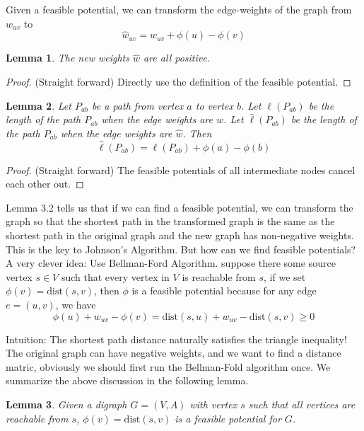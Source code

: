 \documentclass[11pt]{article}
\theoremstyle{plain}
\newtheorem{lemma}{Lemma}[section]
\begin{document}
  Given a feasible potential, we can transform the edge-weights of the graph from $w_{uv}$ to 
  \[
    \hat w_{uv} = w_{uv} + \phi(u) - \phi(v)
  \]

  \begin{lemma}
    The new weights $\hat w$ are all positive.
  \end{lemma}

  \begin{proof}
    (Straight forward) Directly use the definition of the feasible potential.
  \end{proof}

  \begin{lemma}
    Let $P_{ab}$ be a path from vertex $a$ to vertex $b$. Let $\ell(P_{ab})$ be the length of the path $P_{ab}$
    when the edge weights are $w$. Let $\hat \ell(P_{ab})$ be the length of the path $P_{ab}$ when the edge weights
    are $\hat w$. Then 
    \[
      \hat \ell(P_{ab}) = \ell(P_{ab}) + \phi(a) - \phi(b)
    \]
  \end{lemma}

  \begin{proof}
    (Straight forward) The feasible potentials of all intermediate nodes cancel each other out.
  \end{proof}

  Lemma 3.2 tells us that if we can find a feasible potential, we can transform the graph so that the shortest path
  in the transformed graph is the same as the shortest path in the original graph and the new graph has non-negative weights.
  This is the key to Johnson's Algorithm. But how can we find feasible potentials? A very clever idea: Use Bellman-Ford Algorithm.
  suppose there some source vertex $s \in V$ such that every vertex in $V$ is reachable from $s$, if we set $\phi(v) = \text{dist}(s, v)$,
  then $\phi$ is a feasible potential because for any edge $e = (u, v)$, we have
  \[
    \phi(u) + w_{uv} - \phi(v) = \text{dist}(s, u) + w_{uv} - \text{dist}(s, v) \geq 0
  \]

  Intuition: The shortest path distance naturally satisfies the triangle inequality! The original graph can have negative weights,
  and we want to find a distance matric, obviously we should first run the Bellman-Fold algorithm once. We summarize the above discussion
  in the following lemma.

  \begin{lemma}
    Given a digraph $G = (V, A)$ with vertex $s$ such that all
    vertices are reachable from $s$, $\phi(v) = \text{dist}(s, v)$ is a feasible potential for $G$.
  \end{lemma}
\end{document}
